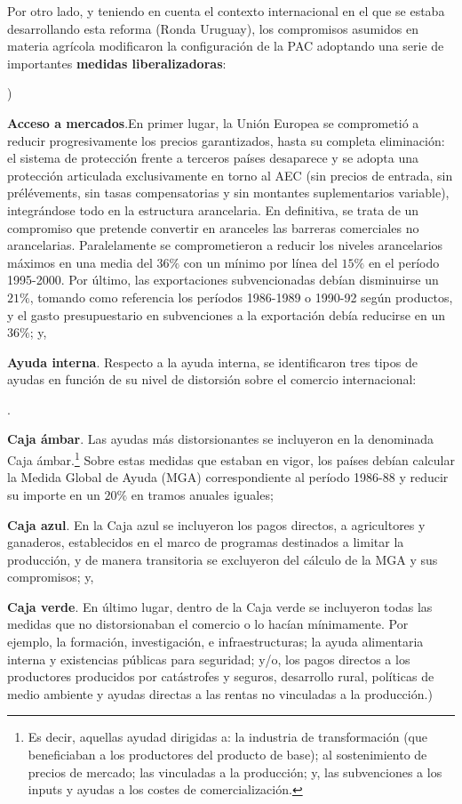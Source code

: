 \documentclass[10pt,a4paper]{article}
\newcounter{alphaitem}
\newcounter{numitem}
\newenvironment{la}
      {\begin{list}{\alph{alphaitem})}{%
          \usecounter{alphaitem}%
          \setlength{\leftmargin}{1cm}%
          \setlength{\parskip}{3pt}%
          \setlength{\itemsep}{0pt}%
          \setlength{\parsep}{0pt}%
      }}
      {\end{list}}
\newenvironment{lnum}
      {\begin{list}{\arabic{numitem}.}{%
          \usecounter{numitem}%
          \setlength{\leftmargin}{1cm}%
          \setlength{\parskip}{3pt}%
          \setlength{\itemsep}{0pt}%
          \setlength{\parsep}{0pt}%
      }}
      {\end{list}}
\begin{document}
Por otro lado, y teniendo en cuenta el contexto internacional en el que se estaba desarrollando esta reforma (Ronda Uruguay), los compromisos asumidos en materia agrícola modificaron la configuración de la PAC adoptando una serie de importantes \textbf{medidas liberalizadoras}:
\begin{la}
    \item \textbf{Acceso a mercados}.En primer lugar, la Unión Europea se comprometió a reducir progresivamente los precios garantizados, hasta su completa eliminación: el sistema de protección frente a terceros países desaparece y se adopta una protección articulada exclusivamente en torno al AEC (sin precios de entrada, sin prélévements, sin tasas compensatorias y sin montantes suplementarios variable), integrándose todo en la estructura arancelaria. En definitiva, se trata de un compromiso que pretende convertir en aranceles las barreras comerciales no arancelarias. Paralelamente se comprometieron a reducir los niveles arancelarios máximos en una media del $36\%$ con un mínimo por línea del $15\%$ en el período 1995-2000. Por último, las exportaciones subvencionadas debían disminuirse un $21\%$, tomando como referencia los períodos 1986-1989 o 1990-92 según productos, y el gasto presupuestario en subvenciones a la exportación debía reducirse en un $36\%$; y,
    \item \textbf{Ayuda interna}. Respecto a la ayuda interna, se identificaron tres tipos de ayudas en función de su nivel de distorsión sobre el comercio internacional:
    \begin{lnum}
        \item \textbf{Caja ámbar}. Las ayudas más distorsionantes se incluyeron en la denominada Caja ámbar.\footnote{%
            Es decir, aquellas ayudad dirigidas a: la industria de transformación (que beneficiaban a los productores del producto de base); al sostenimiento de precios de mercado; las vinculadas a la producción; y, las subvenciones a los inputs y ayudas a los costes de comercialización.
        } Sobre estas medidas que estaban en vigor, los países debían calcular la Medida Global de Ayuda (MGA) correspondiente al período 1986-88 y reducir su importe en un $20\%$ en tramos anuales iguales;
        \item \textbf{Caja azul}. En la Caja azul se incluyeron los pagos directos, a agricultores y ganaderos, establecidos en el marco de programas destinados a limitar la producción, y de manera transitoria se excluyeron del cálculo de la MGA y sus compromisos; y,
        \item \textbf{Caja verde}. En último lugar, dentro de la Caja verde se incluyeron todas las medidas que no distorsionaban el comercio o lo hacían mínimamente. Por ejemplo, la formación, investigación, e infraestructuras; la ayuda alimentaria interna y existencias públicas para seguridad; y/o, los pagos directos a los productores producidos por catástrofes y seguros, desarrollo rural, políticas de medio ambiente y ayudas directas a las rentas no vinculadas a la producción.)
    \end{lnum} 
\end{la}
\end{document}
